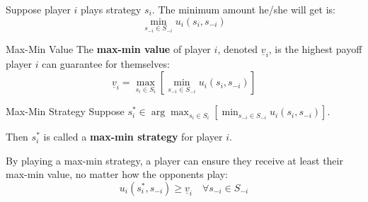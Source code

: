 \documentclass[12pt, a4paper]{article}
\begin{document}
Suppose player $i$ plays strategy $s_i$. The minimum amount he/she will get is:
\[
  \min_{s_{-i} \in S_{-i}} u_i(s_i, s_{-i})
\]

\begin{defbox}{Max-Min Value}
  The \textbf{max-min value} of player $i$, denoted $\underline{v}_i$, is the highest payoff player $i$ can guarantee for themselves:
  \[
    \underline{v}_i = \max_{s_i \in S_i} \left[ \min_{s_{-i} \in S_{-i}} u_i(s_i, s_{-i}) \right]
  \]
\end{defbox}

\begin{defbox}{Max-Min Strategy}
  Suppose $s_i^* \in \arg\max_{s_i \in S_i} \left[ \min_{s_{-i} \in S_{-i}} u_i(s_i, s_{-i}) \right]$. 
  
  Then $s_i^*$ is called a \textbf{max-min strategy} for player $i$.
\end{defbox}

\begin{takebox}
  By playing a max-min strategy, a player can ensure they receive at least their max-min value, no matter how the opponents play:
  \[
    u_i(s_i^*, s_{-i}) \geq \underline{v}_i \quad \forall s_{-i} \in S_{-i}
  \]
\end{takebox}
\end{document}
